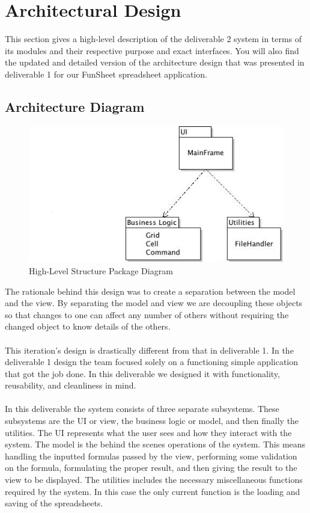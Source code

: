 \documentclass[12pt]{article}
\begin{document}
\section{Architectural Design}
This section gives a high-level description of the deliverable 2 system in terms of its modules and their respective purpose and exact interfaces. You will also find the updated and detailed version of the architecture design that was presented in deliverable 1 for our FunSheet spreadsheet application.
\subsection{Architecture Diagram}
\begin{figure}[htbp]
\includegraphics[scale=.7]{packagediagram.jpg}
\caption{High-Level Structure Package Diagram}
\label{fig:High-Level-Structure-Package-Diagram}
\end{figure}
The rationale behind this design was to create a separation between the model and the view. By separating the model and view we are decoupling these objects so that changes to one can affect any number of others without requiring the changed object to know details of the others.\\\\
This iteration's design is drastically different from that in deliverable 1. In the deliverable 1 design the team focused solely on a functioning simple application that got the job done. In this deliverable we designed it with functionality, reusability, and cleanliness in mind.\\\\
In this deliverable the system consists of three separate subsystems. These subsystems are the UI or view, the business logic or model, and then finally the utilities. The UI represents what the user sees and how they interact with the system. The model is the behind the scenes operations of the system. This means handling the inputted formulas passed by the view, performing some validation on the formula, formulating the proper result, and then giving the result to the view to be displayed. The utilities includes the necessary miscellaneous functions required by the system. In this case the only current function is the loading and saving of the spreadsheets.
\end{document}
